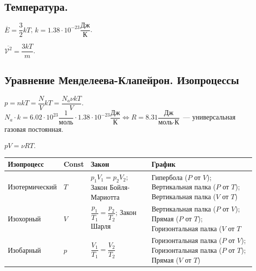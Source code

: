 \documentclass[12pt]{article}
\begin{document}
	\subsection{Температура.}
	\begin{statement}
		$\overline{E} = \dfrac{3}{2}kT$, $k = 1.38 \cdot 10^{-23} \dfrac{\text{Дж}}{\text{К}}$.
	\end{statement}
	\begin{statement}
		$\overline{\mathcal{V}^2} = \dfrac{3kT}{m}$.
	\end{statement}
	\subsection{Уравнение Менделеева-Клапейрон. Изопроцессы}
	$p = nkT = \dfrac{N}{V}kT = \dfrac{N_a \nu kT}{V}$. $N_a \cdot k = 6.02 \cdot 10^{23} \dfrac{1}{\text{моль}} \cdot 1.38 \cdot 10^{-23} \dfrac{\text{Дж}}{\text{К}} \Leftrightarrow R = 8.31 \dfrac{\text{Дж}}{\text{моль} \cdot \text{К}}$~--- универсальная газовая постоянная. \\
	\begin{definition}
		$pV = \nu RT$.
	\end{definition}
	\begin{xltabular}{\textwidth}{|X|X|X|X|}
		\hline
		Изопроцесс & Const & Закон & График \\
		\hline
		Изотермический & $T$ & $p_1V_1 = p_2V_2$; Закон Бойля-Мариотта & Гипербола ($P$ от $V$); Вертикальная палка ($P$ от $T$); Вертикальная палка ($V$ от $T$) \\
		\hline
		Изохорный & $V$ & $\dfrac{p_1}{T_1} = \dfrac{p_2}{T_2}$; Закон Шарля & Вертикальная палка ($P$ от $V$); Прямая ($P$ от $T$); Горизонтальная палка ($V$ от $T$ \\
		\hline
		Изобарный & $p$ & $\dfrac{V_1}{T_1} = \dfrac{V_2}{T_2}$ & Горизонтальная палка ($P$ от $V$); Горизонтальная палка ($P$ от $T$); Прямая ($V$ от $T$) \\
		\hline
	\end{xltabular}
\end{document}

